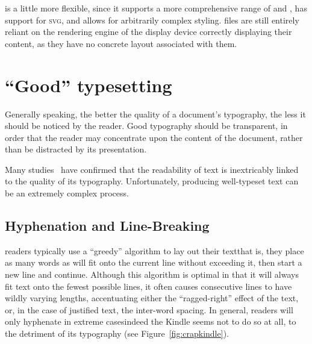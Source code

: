 
\epub{} is a little more flexible, since it supports a more comprehensive range of \xhtml{} and \css{}, has support for \textsc{svg}, and allows for arbitrarily complex styling. \epub{} files are still entirely reliant on the rendering engine of the display device correctly displaying their content, as they have no concrete layout associated with them.



\section{``Good'' typesetting}
\label{sec:goodtypesetting}

Generally speaking, the better the quality of a document's typography, the less it should be noticed by the reader. Good typography should be transparent, in order that the reader may concentrate upon the content of the document, rather than be distracted by its presentation.

Many studies~\cite{Mittelbach1992,Hill1999,Bringhurst2008,Voorhees2011,Legge2011} have confirmed that the readability of text is inextricably linked to the quality of its typography. Unfortunately, producing well-typeset text can be an extremely complex process.



\subsection{Hyphenation and Line-Breaking}
\Ebook{} readers typically use a ``greedy'' algorithm to lay out their text\ed that is, they place as many words as will fit onto the current line without exceeding it, then start a new line and continue. Although this algorithm is optimal in that it will always fit text onto the fewest possible lines, it often causes consecutive lines to have wildly varying lengths, accentuating either the ``ragged-right'' effect of the text, or, in the case of justified text, the inter-word spacing. In general, \ebook{} readers will only hyphenate in extreme cases\ed indeed the Kindle seems not to do so at all, to the detriment of its typography (see Figure~\ref{fig:crapkindle}).

